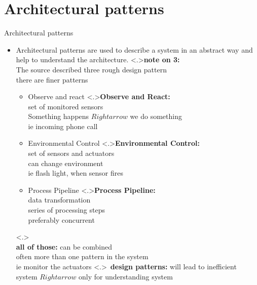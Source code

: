 \documentclass[ngerman={babel}, utf8, bigger, t, xcolor={table,dvipsnames}, ompress, hyperref={bookmarks,colorlinks}]{beamer}
\begin{document}
\section{Architectural patterns}
\begin{frame}{Architectural patterns}
	\begin{itemize}
		\item Architectural patterns are used to describe a system in an abstract way and help to understand the architecture.
		\note<.>{\textbf{note on 3:}\\ The source described three rough design pattern \\ there are finer patterns}
		\begin{itemize}
			\item Observe and react
			\note<.>{\textbf{Observe and React:}\\ set of monitored sensors \\ Something happens $Rightarrow$ we do something \\ ie incoming phone call}
			\item Environmental Control
			\note<.>{\textbf{Environmental Control:}\\ set of sensors and actuators \\ can change environment \\ ie flash light, when sensor fires}
			\item Process Pipeline
			\note<.>{\textbf{Process Pipeline:}\\ data transformation \\ series of processing steps\\ preferably concurrent}
		\end{itemize}
		\note<.>{\\ \textbf{all of those:} can be combined \\ often more than one pattern in the system \\ ie monitor the actuators}
		\note<.>{\ \textbf{design patterns:} will lead to inefficient system $Rightarrow$ only for understanding system}
		\end{itemize}
\end{frame}
\end{document}
